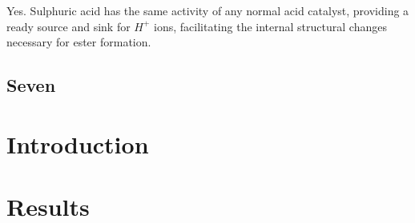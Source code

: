 \documentclass[]{article}
\begin{document}
Yes. Sulphuric acid has the same activity of any normal acid catalyst,
providing a ready source and sink for \(H^{+}\) ions, facilitating the
internal structural changes necessary for ester formation.

\hypertarget{seven}{%
\subsection{Seven}\label{seven}}

\hypertarget{introduction}{%
\section{Introduction}\label{introduction}}

\hypertarget{results}{%
\section{Results}\label{results}}
\end{document}
